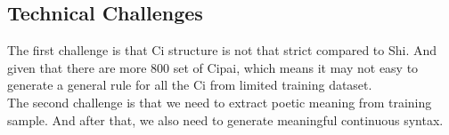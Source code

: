 \subsection{Technical Challenges}
The first challenge is that Ci structure is not that strict compared to Shi. And given that there are more 800 set of Cipai, which means it may not easy to generate a general rule for all the Ci from limited training dataset.\\

The second challenge is that we need to extract poetic meaning from training sample. And after that, we also need to generate meaningful continuous syntax.


